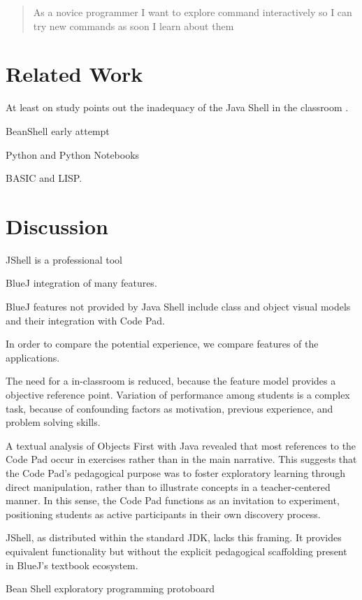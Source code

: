 \documentclass{article}
\begin{document}
\begin{quote}
As a novice programmer
I want to explore command interactively
so I can try new commands as soon I learn about them
\end{quote}


\section{Related Work}

At least on study points out the inadequacy of the Java Shell in the classroom
\cite{politz_minnes2018jshell}.


BeanShell early attempt

Python and Python Notebooks

BASIC and LISP.

\section{Discussion}

JShell is a professional tool

BlueJ integration of many features.

BlueJ features not provided by Java Shell include class and object visual models and their integration with Code Pad.

In order to compare the potential experience, we compare features of the applications.

The need for a in-classroom is reduced, because the feature model provides a objective reference point. Variation of performance among students is a complex task, because of confounding factors as motivation, previous experience, and problem solving skills.

A textual analysis of Objects First with Java revealed that most references to the Code Pad occur in exercises rather than in the main narrative. This suggests that the Code Pad’s pedagogical purpose was to foster exploratory learning through direct manipulation, rather than to illustrate concepts in a teacher-centered manner. In this sense, the Code Pad functions as an invitation to experiment, positioning students as active participants in their own discovery process.

JShell, as distributed within the standard JDK, lacks this framing. It provides equivalent functionality but without the explicit pedagogical scaffolding present in BlueJ’s textbook ecosystem.

Bean Shell exploratory programming
protoboard
\end{document}
